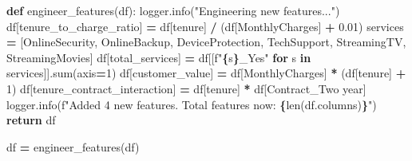 \documentclass[preprint, 3p,
authoryear]{elsarticle} %
\newenvironment{Shaded}{\begin{snugshade}}{\end{snugshade}}
\newcommand{\BuiltInTok}[1]{#1}
\newcommand{\ControlFlowTok}[1]{\textcolor[rgb]{0.13,0.29,0.53}{\textbf{#1}}}
\newcommand{\DecValTok}[1]{\textcolor[rgb]{0.00,0.00,0.81}{#1}}
\newcommand{\FloatTok}[1]{\textcolor[rgb]{0.00,0.00,0.81}{#1}}
\newcommand{\KeywordTok}[1]{\textcolor[rgb]{0.13,0.29,0.53}{\textbf{#1}}}
\newcommand{\NormalTok}[1]{#1}
\newcommand{\OperatorTok}[1]{\textcolor[rgb]{0.81,0.36,0.00}{\textbf{#1}}}
\newcommand{\SpecialCharTok}[1]{\textcolor[rgb]{0.81,0.36,0.00}{\textbf{#1}}}
\newcommand{\SpecialStringTok}[1]{\textcolor[rgb]{0.31,0.60,0.02}{#1}}
\newcommand{\StringTok}[1]{\textcolor[rgb]{0.31,0.60,0.02}{#1}}
\begin{document}
\begin{Shaded}
\begin{Highlighting}[]
\KeywordTok{def}\NormalTok{ engineer\_features(df):}
\NormalTok{    logger.info(}\StringTok{"Engineering new features..."}\NormalTok{)}
\NormalTok{    df[}\StringTok{\textquotesingle{}tenure\_to\_charge\_ratio\textquotesingle{}}\NormalTok{] }\OperatorTok{=}\NormalTok{ df[}\StringTok{\textquotesingle{}tenure\textquotesingle{}}\NormalTok{] }\OperatorTok{/}\NormalTok{ (df[}\StringTok{\textquotesingle{}MonthlyCharges\textquotesingle{}}\NormalTok{] }\OperatorTok{+} \FloatTok{0.01}\NormalTok{)}
\NormalTok{    services }\OperatorTok{=}\NormalTok{ [}\StringTok{\textquotesingle{}OnlineSecurity\textquotesingle{}}\NormalTok{, }\StringTok{\textquotesingle{}OnlineBackup\textquotesingle{}}\NormalTok{, }\StringTok{\textquotesingle{}DeviceProtection\textquotesingle{}}\NormalTok{, }\StringTok{\textquotesingle{}TechSupport\textquotesingle{}}\NormalTok{, }\StringTok{\textquotesingle{}StreamingTV\textquotesingle{}}\NormalTok{, }\StringTok{\textquotesingle{}StreamingMovies\textquotesingle{}}\NormalTok{]}
\NormalTok{    df[}\StringTok{\textquotesingle{}total\_services\textquotesingle{}}\NormalTok{] }\OperatorTok{=}\NormalTok{ df[[}\SpecialStringTok{f"}\SpecialCharTok{\{}\NormalTok{s}\SpecialCharTok{\}}\SpecialStringTok{\_Yes"} \ControlFlowTok{for}\NormalTok{ s }\KeywordTok{in}\NormalTok{ services]].}\BuiltInTok{sum}\NormalTok{(axis}\OperatorTok{=}\DecValTok{1}\NormalTok{)}
\NormalTok{    df[}\StringTok{\textquotesingle{}customer\_value\textquotesingle{}}\NormalTok{] }\OperatorTok{=}\NormalTok{ df[}\StringTok{\textquotesingle{}MonthlyCharges\textquotesingle{}}\NormalTok{] }\OperatorTok{*}\NormalTok{ (df[}\StringTok{\textquotesingle{}tenure\textquotesingle{}}\NormalTok{] }\OperatorTok{+} \DecValTok{1}\NormalTok{)}
\NormalTok{    df[}\StringTok{\textquotesingle{}tenure\_contract\_interaction\textquotesingle{}}\NormalTok{] }\OperatorTok{=}\NormalTok{ df[}\StringTok{\textquotesingle{}tenure\textquotesingle{}}\NormalTok{] }\OperatorTok{*}\NormalTok{ df[}\StringTok{\textquotesingle{}Contract\_Two year\textquotesingle{}}\NormalTok{]}
\NormalTok{    logger.info(}\SpecialStringTok{f"Added 4 new features. Total features now: }\SpecialCharTok{\{}\BuiltInTok{len}\NormalTok{(df.columns)}\SpecialCharTok{\}}\SpecialStringTok{"}\NormalTok{)}
    \ControlFlowTok{return}\NormalTok{ df}

\NormalTok{df }\OperatorTok{=}\NormalTok{ engineer\_features(df)}
\end{Highlighting}
\end{Shaded}
\end{document}
